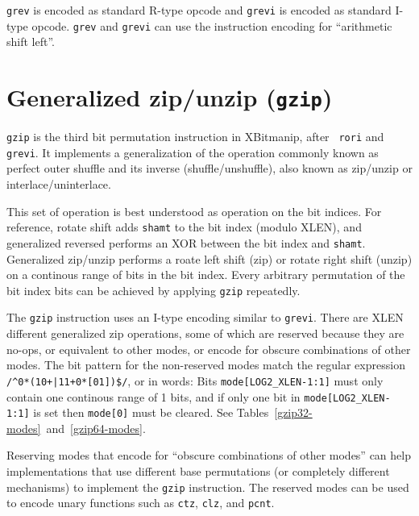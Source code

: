 

\texttt{grev} is encoded as standard R-type opcode and \texttt{grevi} is
encoded as standard I-type opcode. \texttt{grev} and \texttt{grevi} can
use the instruction encoding for ``arithmetic shift left''.

%
%
%


\section{Generalized zip/unzip (\texttt{gzip})}
\label{gzip}

{\tt gzip} is the third bit permutation instruction in XBitmanip, after {\tt
rori} and {\tt grevi}. It implements a generalization of the operation commonly
known as perfect outer shuffle and its inverse (shuffle/unshuffle), also known
as zip/unzip or interlace/uninterlace.

This set of operation is best understood as operation on the bit indices. For
reference, rotate shift adds {\tt shamt} to the bit index (modulo XLEN), and
generalized reversed performs an XOR between the bit index and {\tt shamt}.
Generalized zip/unzip performs a roate left shift (zip) or rotate right shift (unzip)
on a continous range of bits in the bit index. Every arbitrary permutation
of the bit index bits can be achieved by applying {\tt gzip} repeatedly.

The {\tt gzip} instruction uses an I-type encoding similar to {\tt grevi}.
There are XLEN different generalized zip operations, some of which are reserved
because they are no-ops, or equivalent to other modes, or encode for obscure
combinations of other modes. The bit pattern for the non-reserved modes
match the regular expression {\tt /\^{}0*(10+|11+0*[01])\$/}, or in words:
Bits {\tt mode[LOG2\_XLEN-1:1]} must only contain one continous range of
1 bits, and if only one bit in {\tt mode[LOG2\_XLEN-1:1]} is set then
{\tt mode[0]} must be cleared. See Tables~\ref{gzip32-modes}~and~\ref{gzip64-modes}.

Reserving modes that encode for ``obscure combinations of other modes'' can help
implementations that use different base permutations (or completely different
mechanisms) to implement the {\tt gzip} instruction. The reserved modes can be
used to encode unary functions such as {\tt ctz}, {\tt clz}, and {\tt pcnt}.

